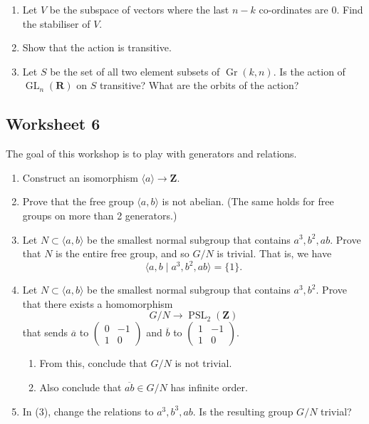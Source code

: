 \documentclass[11pt]{article}
\begin{document}
\begin{enumerate}
\item Let \(V\) be the subspace of vectors where the last \(n-k\) co-ordinates are 0.
Find the stabiliser of \(V\).

\item Show that the action is transitive.

\item Let \(S\) be the set of all two element subsets of \(\operatorname{Gr}(k,n)\).
Is the action of \(\operatorname{GL}_n(\mathbf{R})\) on \(S\) transitive?
What are the orbits of the action?
\end{enumerate}

\subsection{Worksheet 6}
\label{sec:org5a9d67a}
The goal of this workshop is to play with generators and relations.

\begin{enumerate}
\item Construct an isomorphism \(\langle a \rangle \to \mathbf{Z}\).
\item Prove that the free group \(\langle a, b \rangle\) is not abelian. (The same holds for free groups on more than 2 generators.)
\item Let \(N \subset \langle a, b \rangle\) be the smallest normal subgroup that contains \(a^3, b^2, ab\).
Prove that \(N\) is the entire free group, and so \(G/N\) is trivial.
That is, we have
\[ \langle a, b \mid a^3, b^2, ab \rangle = \{1\}.\]
\item Let \(N \subset \langle a, b \rangle\) be the smallest normal subgroup that contains \(a^3, b^2\).
Prove that there exists a homomorphism
\[ G/N \to \operatorname{PSL}_2(\mathbf{Z})\]
that sends \(\overline a\) to \(\begin{pmatrix}0 & -1 \\ 1 & 0 \end{pmatrix}\) and \(\overline b\) to \(\begin{pmatrix}1 & -1 \\ 1 & 0 \end{pmatrix}\).
\begin{enumerate}
\item From this, conclude that \(G/N\) is not trivial.
\item Also conclude that \(\overline{ab} \in G/N\)  has infinite order.
\end{enumerate}
\item In (3), change the relations to \(a^3, b^3, ab\).  Is the resulting group \(G/N\) trivial?
\end{enumerate}
\end{document}
